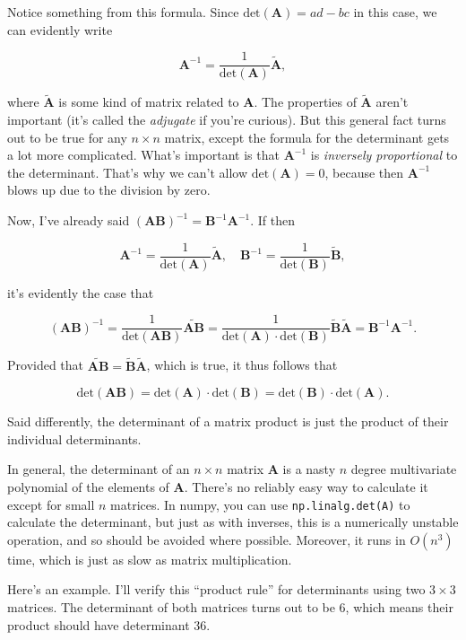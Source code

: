 \documentclass[
  letterpaper,
  DIV=11,
  numbers=noendperiod]{scrreprt}
\begin{document}
Notice something from this formula. Since
\(\text{det}(\mathbf{A}) = ad - bc\) in this case, we can evidently
write

\[\mathbf{A}^{-1} = \frac{1}{\text{det}(\mathbf{A})} \mathbf{\tilde A},\]

where \(\mathbf{\tilde A}\) is some kind of matrix related to
\(\mathbf{A}\). The properties of \(\mathbf{\tilde A}\) aren't important
(it's called the \emph{adjugate} if you're curious). But this general
fact turns out to be true for any \(n \times n\) matrix, except the
formula for the determinant gets a lot more complicated. What's
important is that \(\mathbf{A}^{-1}\) is \emph{inversely proportional}
to the determinant. That's why we can't allow
\(\text{det}(\mathbf{A}) = 0\), because then \(\mathbf{A}^{-1}\) blows
up due to the division by zero.

Now, I've already said
\((\mathbf{A}\mathbf{B})^{-1} = \mathbf{B}^{-1} \mathbf{A}^{-1}\). If
then

\[\mathbf{A}^{-1} = \frac{1}{\text{det}(\mathbf{A})}\mathbf{\tilde A}, \quad \mathbf{B}^{-1} = \frac{1}{\text{det}(\mathbf{B})}\mathbf{\tilde B},\]

it's evidently the case that

\[(\mathbf{AB})^{-1} = \frac{1}{\text{det}(\mathbf{AB})}\mathbf{\tilde{AB}} = \frac{1}{\text{det}(\mathbf{A}) \cdot \text{det}(\mathbf{B})}\mathbf{\tilde B}\mathbf{\tilde A} = \mathbf{B}^{-1} \mathbf{A}^{-1}.\]

Provided that
\(\mathbf{\tilde{AB}}=\mathbf{\tilde B}\mathbf{\tilde A}\), which is
true, it thus follows that

\[\text{det}(\mathbf{A}\mathbf{B}) = \text{det}(\mathbf{A}) \cdot \text{det}(\mathbf{B}) = \text{det}(\mathbf{B}) \cdot \text{det}(\mathbf{A}).\]

Said differently, the determinant of a matrix product is just the
product of their individual determinants.

In general, the determinant of an \(n \times n\) matrix \(\mathbf{A}\)
is a nasty \(n\) degree multivariate polynomial of the elements of
\(\mathbf{A}\). There's no reliably easy way to calculate it except for
small \(n\) matrices. In numpy, you can use \texttt{np.linalg.det(A)} to
calculate the determinant, but just as with inverses, this is a
numerically unstable operation, and so should be avoided where possible.
Moreover, it runs in \(O(n^3)\) time, which is just as slow as matrix
multiplication.

Here's an example. I'll verify this ``product rule'' for determinants
using two \(3 \times 3\) matrices. The determinant of both matrices
turns out to be \(6\), which means their product should have determinant
\(36\).
\end{document}
